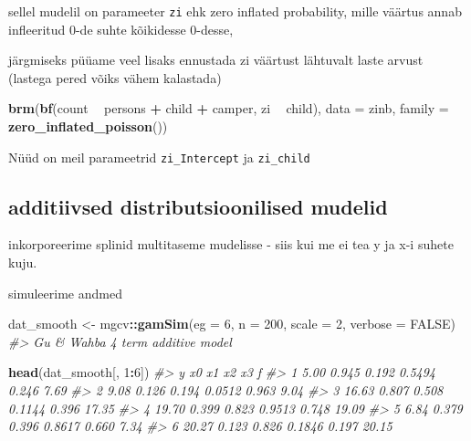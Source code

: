 \documentclass[]{book}
\newenvironment{Shaded}{\begin{snugshade}}{\end{snugshade}}
\newcommand{\CommentTok}[1]{\textcolor[rgb]{0.56,0.35,0.01}{\textit{#1}}}
\newcommand{\DataTypeTok}[1]{\textcolor[rgb]{0.13,0.29,0.53}{#1}}
\newcommand{\DecValTok}[1]{\textcolor[rgb]{0.00,0.00,0.81}{#1}}
\newcommand{\KeywordTok}[1]{\textcolor[rgb]{0.13,0.29,0.53}{\textbf{#1}}}
\newcommand{\NormalTok}[1]{#1}
\newcommand{\OperatorTok}[1]{\textcolor[rgb]{0.81,0.36,0.00}{\textbf{#1}}}
\newcommand{\OtherTok}[1]{\textcolor[rgb]{0.56,0.35,0.01}{#1}}
\newcommand{\StringTok}[1]{\textcolor[rgb]{0.31,0.60,0.02}{#1}}
\begin{document}
sellel mudelil on parameeter \texttt{zi} ehk zero inflated probability, mille väärtus annab infleeritud 0-de suhte kõikidesse 0-desse,

järgmiseks püüame veel lisaks ennustada zi väärtust lähtuvalt laste arvust (lastega pered võiks vähem kalastada)

\begin{Shaded}
\begin{Highlighting}[]
\KeywordTok{brm}\NormalTok{(}\KeywordTok{bf}\NormalTok{(count }\OperatorTok{~}\StringTok{ }\NormalTok{persons }\OperatorTok{+}\StringTok{ }\NormalTok{child }\OperatorTok{+}\StringTok{ }\NormalTok{camper, }
\NormalTok{       zi }\OperatorTok{~}\StringTok{ }\NormalTok{child), }\DataTypeTok{data =}\NormalTok{ zinb, }\DataTypeTok{family =} \KeywordTok{zero_inflated_poisson}\NormalTok{())}
\end{Highlighting}
\end{Shaded}

Nüüd on meil parameetrid \texttt{zi\_Intercept} ja \texttt{zi\_child}

\hypertarget{additiivsed-distributsioonilised-mudelid}{%
\subsection{additiivsed distributsioonilised mudelid}\label{additiivsed-distributsioonilised-mudelid}}

inkorporeerime splinid multitaseme mudelisse - siis kui me ei tea y ja x-i suhete kuju.

simuleerime andmed

\begin{Shaded}
\begin{Highlighting}[]
\NormalTok{dat_smooth <-}\StringTok{ }\NormalTok{mgcv}\OperatorTok{::}\KeywordTok{gamSim}\NormalTok{(}\DataTypeTok{eg =} \DecValTok{6}\NormalTok{, }\DataTypeTok{n =} \DecValTok{200}\NormalTok{, }\DataTypeTok{scale =} \DecValTok{2}\NormalTok{, }\DataTypeTok{verbose =} \OtherTok{FALSE}\NormalTok{)}
\CommentTok{#> Gu & Wahba 4 term additive model}
\end{Highlighting}
\end{Shaded}

\begin{Shaded}
\begin{Highlighting}[]
\KeywordTok{head}\NormalTok{(dat_smooth[, }\DecValTok{1}\OperatorTok{:}\DecValTok{6}\NormalTok{])}
\CommentTok{#>       y    x0    x1     x2    x3     f}
\CommentTok{#> 1  5.00 0.945 0.192 0.5494 0.246  7.69}
\CommentTok{#> 2  9.08 0.126 0.194 0.0512 0.963  9.04}
\CommentTok{#> 3 16.63 0.807 0.508 0.1144 0.396 17.35}
\CommentTok{#> 4 19.70 0.399 0.823 0.9513 0.748 19.09}
\CommentTok{#> 5  6.84 0.379 0.396 0.8617 0.660  7.34}
\CommentTok{#> 6 20.27 0.123 0.826 0.1846 0.197 20.15}
\end{Highlighting}
\end{Shaded}
\end{document}
